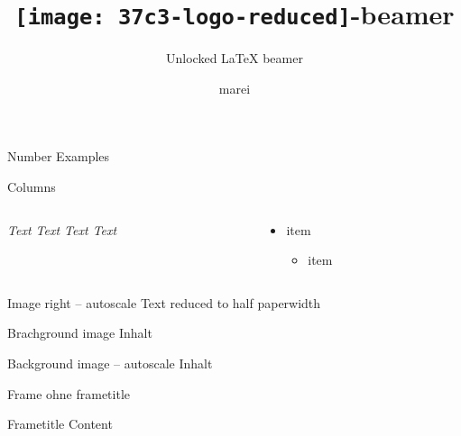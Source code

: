\documentclass[aspectratio=169,t]{beamer}
\title{\texorpdfstring{{\texttt{[image: 37c3-logo-reduced]}}}{37c3}-beamer}
\subtitle{Unlocked \LaTeX{} beamer}
\author{marei \email{chaos@texhackse.de}}
\begin{document}
\maketitle

\begin{frame}{Number Examples}



\end{frame}

\begin{frame}{Columns}
	\begin{columns}[onlytextwidth]
		\begin{column}{.5\linewidth}
		\emph{Text Text Text Text }
		\end{column}
		\begin{column}{.5\linewidth}
		\begin{itemize}
			\item item
			\begin{itemize}
				\item item
			\end{itemize}
		\end{itemize}
		\end{column}
	\end{columns}
\end{frame}


\begin{frame}[rightimage*={\texttt{[image: example-image]}}]{Image right – autoscale}
	Text reduced to half paperwidth
\end{frame}


\begin{frame}[image={\texttt{[image: example-image]}}]{Brachground image}
Inhalt
\end{frame}


\begin{frame}[image*={\texttt{[image: example-image]}}]{Background image – autoscale}
Inhalt
\end{frame}

\begin{frame}
Frame ohne frametitle
\end{frame}


\begin{frame}{Frametitle}
Content
\end{frame}

\newcommand*{\testcolor}[3]{\makebox[.3\linewidth][s]{#1 \textcolor{#1}{\rule{\ht\strutbox}{\ht\strutbox}}}\hfill}
\end{document}
